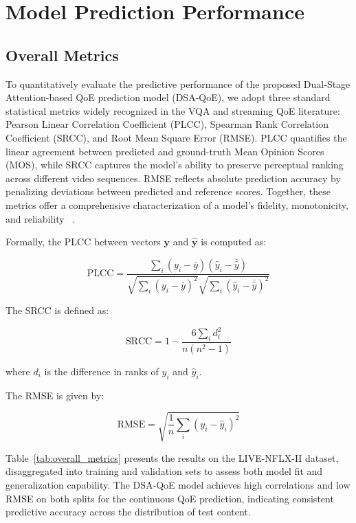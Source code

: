 \section{Model Prediction Performance}

\subsection{Overall Metrics}
\label{sec:overall_metrics}

To quantitatively evaluate the predictive performance of the proposed Dual-Stage Attention-based QoE prediction model (DSA-QoE), 
we adopt three standard statistical metrics widely recognized in the VQA and streaming QoE literature: Pearson Linear Correlation Coefficient (PLCC), 
Spearman Rank Correlation Coefficient (SRCC), and Root Mean Square Error (RMSE). PLCC quantifies the linear agreement between predicted and ground-truth 
Mean Opinion Scores (MOS), while SRCC captures the model's ability to preserve perceptual ranking across different video sequences. RMSE reflects absolute 
prediction accuracy by penalizing deviations between predicted and reference scores. Together, these metrics offer a comprehensive characterization of a model's fidelity, 
monotonicity, and reliability ~\cite{sheikh2006statistical, mittal2012vbed}.

Formally, the PLCC between vectors $\mathbf{y}$ and $\hat{\mathbf{y}}$ is computed as:

\begin{equation}
\mathrm{PLCC} = \frac{\sum_i (y_i - \bar{y})(\hat{y}_i - \bar{\hat{y}})}{\sqrt{\sum_i (y_i - \bar{y})^2} \sqrt{\sum_i (\hat{y}_i - \bar{\hat{y}})^2}}
\end{equation}

The SRCC is defined as:

\begin{equation}
\mathrm{SRCC} = 1 - \frac{6 \sum_i d_i^2}{n(n^2 - 1)}
\end{equation}

where $d_i$ is the difference in ranks of $y_i$ and $\hat{y}_i$. 

The RMSE is given by:

\begin{equation}
\mathrm{RMSE} = \sqrt{\frac{1}{n} \sum_i (y_i - \hat{y}_i)^2}
\end{equation}

Table~\ref{tab:overall_metrics} presents the results on the LIVE-NFLX-II dataset, disaggregated into training and validation sets to assess both model fit and 
generalization capability. The DSA-QoE model achieves high correlations and low RMSE on both splits for the continuous QoE prediction, indicating consistent predictive accuracy 
across the distribution of test content.

